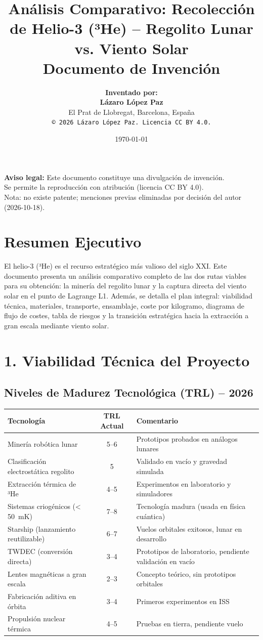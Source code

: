 \documentclass[11pt,a4paper]{article}
\title{\textbf{Análisis Comparativo: Recolección de Helio-3 (³He) – Regolito Lunar vs. Viento Solar}\\[1em]
       \large \textbf{Documento de Invención}}
\author{\textbf{Inventado por:} \\[0.3em]
        \textbf{Lázaro López Paz} \\[0.3em]
        El Prat de Llobregat, Barcelona, España \\[0.3em]
        \texttt{© 2026 Lázaro López Paz. Licencia CC BY 4.0.}}
\date{\today}
\begin{document}
\maketitle
\vspace{-1.5em}
\begin{flushleft}
\small
\textbf{Aviso legal:} Este documento constituye una divulgación de invención. \\
Se permite la reproducción con atribución (licencia CC BY 4.0). \\
Nota: no existe patente; menciones previas eliminadas por decisión del autor (2026-10-18).
\end{flushleft}
\vspace{1em}
\section{Resumen Ejecutivo}
El helio-3 (³He) es el recurso estratégico más valioso del siglo XXI. Este documento presenta un análisis comparativo completo de las dos rutas viables para su obtención: la minería del regolito lunar y la captura directa del viento solar en el punto de Lagrange L1. Además, se detalla el plan integral: viabilidad técnica, materiales, transporte, ensamblaje, coste por kilogramo, diagrama de flujo de costes, tabla de riesgos y la transición estratégica hacia la extracción a gran escala mediante viento solar.
\section{1. Viabilidad Técnica del Proyecto}
\subsection{Niveles de Madurez Tecnológica (TRL) – 2026}
\begin{table}[H]
\centering
\begin{tabular}{l c l}
\toprule
\textbf{Tecnología} & \textbf{TRL Actual} & \textbf{Comentario} \\
\midrule
Minería robótica lunar & 5--6 & Prototipos probados en análogos lunares \\
Clasificación electrostática regolito & 5 & Validado en vacío y gravedad simulada \\
Extracción térmica de ³He & 4--5 & Experimentos en laboratorio y simuladores \\
Sistemas criogénicos (< \SI{50}{\milli\kelvin}) & 7--8 & Tecnología madura (usada en física cuántica) \\
Starship (lanzamiento reutilizable) & 6--7 & Vuelos orbitales exitosos, lunar en desarrollo \\
TWDEC (conversión directa) & 3--4 & Prototipos de laboratorio, pendiente validación en vacío \\
Lentes magnéticas a gran escala & 2--3 & Concepto teórico, sin prototipos orbitales \\
Fabricación aditiva en órbita & 3--4 & Primeros experimentos en ISS \\
Propulsión nuclear térmica & 4--5 & Pruebas en tierra, pendiente vuelo \\
\bottomrule
\end{tabular}
\end{table}
\end{document}
